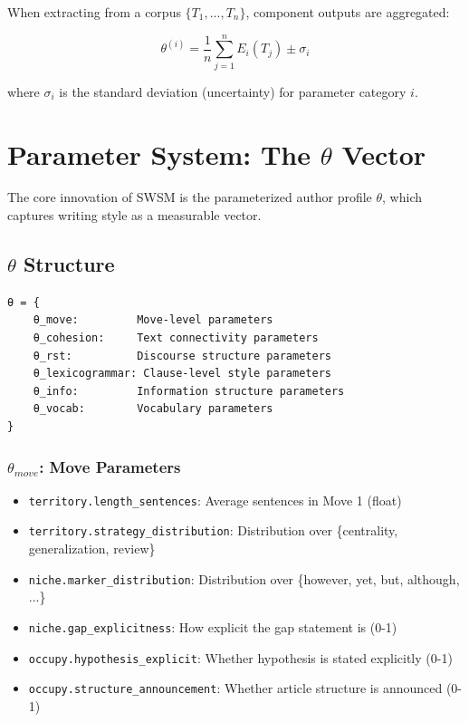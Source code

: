 When extracting from a corpus $\{T_1, ..., T_n\}$, component outputs are aggregated:

\begin{equation}
\theta^{(i)} = \frac{1}{n} \sum_{j=1}^{n} E_i(T_j) \pm \sigma_i
\end{equation}

where $\sigma_i$ is the standard deviation (uncertainty) for parameter category $i$.


\section{Parameter System: The $\theta$ Vector}
\label{sec:sw-theta}

The core innovation of SWSM is the parameterized author profile $\theta$, which captures writing style as a measurable vector.

\subsection{$\theta$ Structure}
\label{sec:sw-theta-structure}

\begin{tcolorbox}[colback=blue!5!white, colframe=blue!75!black, title=$\theta$ Parameter Schema]
\begin{verbatim}
θ = {
    θ_move:         Move-level parameters
    θ_cohesion:     Text connectivity parameters
    θ_rst:          Discourse structure parameters
    θ_lexicogrammar: Clause-level style parameters
    θ_info:         Information structure parameters
    θ_vocab:        Vocabulary parameters
}
\end{verbatim}
\end{tcolorbox}

\subsubsection{$\theta_{move}$: Move Parameters}

\begin{itemize}
    \item \texttt{territory.length\_sentences}: Average sentences in Move 1 (float)
    \item \texttt{territory.strategy\_distribution}: Distribution over \{centrality, generalization, review\}
    \item \texttt{niche.marker\_distribution}: Distribution over \{however, yet, but, although, ...\}
    \item \texttt{niche.gap\_explicitness}: How explicit the gap statement is (0-1)
    \item \texttt{occupy.hypothesis\_explicit}: Whether hypothesis is stated explicitly (0-1)
    \item \texttt{occupy.structure\_announcement}: Whether article structure is announced (0-1)
\end{itemize}

